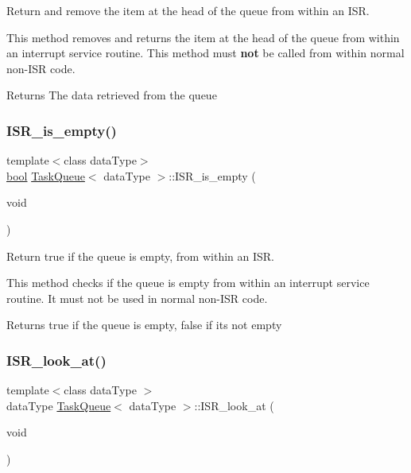 Return and remove the item at the head of the queue from within an I\+SR. 

This method removes and returns the item at the head of the queue from within an interrupt service routine. This method must {\bfseries not} be called from within normal non-\/\+I\+SR code. \begin{DoxyReturn}{Returns}
The data retrieved from the queue 
\end{DoxyReturn}
\mbox{\label{class_task_queue_a15630b93ea2a6428aff8234213fac24f}} 
\subsubsection{\texorpdfstring{I\+S\+R\+\_\+is\+\_\+empty()}{ISR\_is\_empty()}}
{\footnotesize\ttfamily template$<$class data\+Type$>$ \\
\mbox{\hyperlink{group___motor___boolean___type_ga0ecf26b576b9a54eca656b9be7ba6a06}{bool}} \mbox{\hyperlink{class_task_queue}{Task\+Queue}}$<$ data\+Type $>$\+::I\+S\+R\+\_\+is\+\_\+empty (\begin{DoxyParamCaption}\item[{void}]{ }\end{DoxyParamCaption})\hspace{0.3cm}{\ttfamily [inline]}}



Return true if the queue is empty, from within an I\+SR. 

This method checks if the queue is empty from within an interrupt service routine. It must not be used in normal non-\/\+I\+SR code. \begin{DoxyReturn}{Returns}
{\ttfamily true} if the queue is empty, {\ttfamily false} if it\textquotesingle{}s not empty 
\end{DoxyReturn}
\mbox{\label{class_task_queue_a5f13cf022edebc95b8c9ca36814a820b}} 
\subsubsection{\texorpdfstring{I\+S\+R\+\_\+look\+\_\+at()}{ISR\_look\_at()}}
{\footnotesize\ttfamily template$<$class data\+Type $>$ \\
data\+Type \mbox{\hyperlink{class_task_queue}{Task\+Queue}}$<$ data\+Type $>$\+::I\+S\+R\+\_\+look\+\_\+at (\begin{DoxyParamCaption}\item[{void}]{ }\end{DoxyParamCaption})\hspace{0.3cm}{\ttfamily [inline]}}



